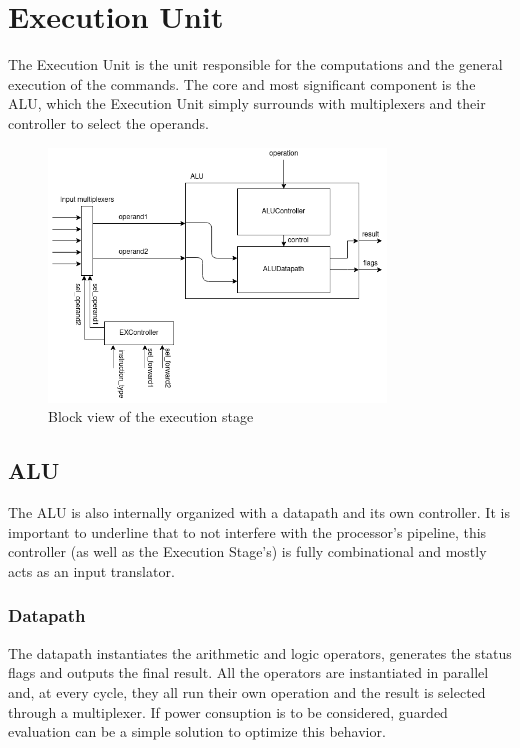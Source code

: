 \section{Execution Unit}
The Execution Unit is the unit responsible for the computations and the general execution of the commands.
The core and most significant component is the ALU, which the Execution Unit simply surrounds with multiplexers
and their controller to select the operands.

\begin{figure}[htbp]
    \center
	\includegraphics[width=0.8\textwidth]{./2-implementation/images/ExStage.png}
	\caption{Block view of the execution stage}
	\label{fig:exstage}
\end{figure}

\subsection{ALU}
The ALU is also internally organized with a datapath and its own controller. It is important to underline that to not
interfere with the processor's pipeline, this controller (as well as the Execution Stage's) is fully combinational and
mostly acts as an input translator.

\subsubsection{Datapath}
The datapath instantiates the arithmetic and logic operators, generates the status flags and outputs the final result.
All the operators are instantiated in parallel and, at every cycle, they all run their own operation and the result
is selected through a multiplexer. If power consuption is to be considered, guarded evaluation can be a simple
solution to optimize this behavior.

